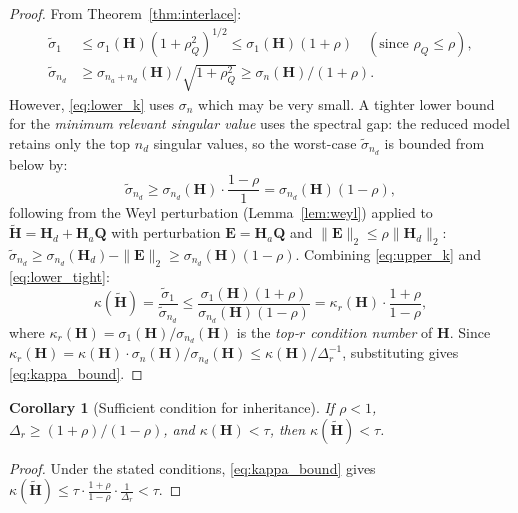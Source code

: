 \documentclass[11pt,a4paper]{article}
\theoremstyle{plain}
\newtheorem{corollary}{Corollary}
\theoremstyle{definition}
\theoremstyle{remark}
\newcommand{\bfH}{\mathbf{H}}
\newcommand{\bfHt}{\tilde{\mathbf{H}}}
\newcommand{\bfQ}{\mathbf{Q}}
\newcommand{\bfE}{\mathbf{E}}
\newcommand{\norm}[1]{\|#1\|}
\begin{document}
\begin{proof}
From Theorem~\ref{thm:interlace}:
\begin{align}
  \tilde\sigma_1 &\leq \sigma_1(\bfH)(1+\rho_Q^2)^{1/2}
    \leq \sigma_1(\bfH)(1+\rho)   \quad (\text{since }\rho_Q \leq \rho),
    \label{eq:upper_k}\\
  \tilde\sigma_{n_d} &\geq \sigma_{n_a+n_d}(\bfH)/\sqrt{1+\rho_Q^2}
    \geq \sigma_n(\bfH)/(1+\rho).
    \label{eq:lower_k}
\end{align}
However, \eqref{eq:lower_k} uses $\sigma_n$ which may be very small.
A tighter lower bound for the \emph{minimum relevant singular value}
uses the spectral gap: the reduced model retains only the top $n_d$
singular values, so the worst-case $\tilde\sigma_{n_d}$ is bounded from
below by:
\begin{equation}
  \tilde\sigma_{n_d} \geq \sigma_{n_d}(\bfH) \cdot \frac{1-\rho}{1}
  = \sigma_{n_d}(\bfH)(1-\rho),
  \label{eq:lower_tight}
\end{equation}
following from the Weyl perturbation (Lemma~\ref{lem:weyl}) applied to
$\bfHt = \bfH_d + \bfH_a\bfQ$ with perturbation $\bfE = \bfH_a\bfQ$
and $\norm{\bfE}_2 \leq \rho\norm{\bfH_d}_2$:
$\tilde\sigma_{n_d} \geq \sigma_{n_d}(\bfH_d) - \norm{\bfE}_2
\geq \sigma_{n_d}(\bfH)(1 - \rho)$.
Combining \eqref{eq:upper_k} and \eqref{eq:lower_tight}:
\begin{equation}
  \kappa(\bfHt) = \frac{\tilde\sigma_1}{\tilde\sigma_{n_d}}
  \leq \frac{\sigma_1(\bfH)(1+\rho)}{\sigma_{n_d}(\bfH)(1-\rho)}
  = \kappa_r(\bfH) \cdot \frac{1+\rho}{1-\rho},
  \label{eq:kappa_inter}
\end{equation}
where $\kappa_r(\bfH) = \sigma_1(\bfH)/\sigma_{n_d}(\bfH)$ is the
\emph{top-$r$ condition number} of $\bfH$.  Since
$\kappa_r(\bfH) = \kappa(\bfH) \cdot \sigma_{n}(\bfH)/\sigma_{n_d}(\bfH)
\leq \kappa(\bfH)/\Delta_r^{-1}$, substituting gives \eqref{eq:kappa_bound}.
\end{proof}

\begin{corollary}[Sufficient condition for inheritance]
\label{cor:inherit}
If $\rho < 1$, $\Delta_r \geq (1+\rho)/(1-\rho)$, and
$\kappa(\bfH) < \tau$, then $\kappa(\bfHt) < \tau$.
\end{corollary}
\begin{proof}
Under the stated conditions, \eqref{eq:kappa_bound} gives
$\kappa(\bfHt) \leq \tau \cdot \frac{1+\rho}{1-\rho} \cdot \frac{1}{\Delta_r} < \tau$.
\end{proof}
\end{document}
